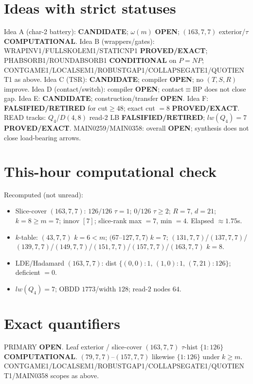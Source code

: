 \documentclass[11pt]{article}
\begin{document}
\section*{Ideas with strict statuses}
Idea A (char-2 battery): \textbf{CANDIDATE}; $\omega(m)$ \textbf{OPEN}; $(163,7,7)$ exterior/$\tau$ \textbf{COMPUTATIONAL}.
Idea B (wrappers/gates): WRAPINV1/FULLSKOLEM1/STATICNP1 \textbf{PROVED/EXACT};
PHABSORB1/ROUNDABSORB1 \textbf{CONDITIONAL} on $P=NP$;
CONTGAME1/LOCALSEM1/ROBUSTGAP1/COLLAPSEGATE1/QUOTIENT1 as above.
Idea C (TSR): \textbf{CANDIDATE}; compiler \textbf{OPEN}; no $(T,S,R)$ improve.
Idea D (contact/switch): compiler \textbf{OPEN}; contact$\equiv$BP does not close gap.
Idea E: \textbf{CANDIDATE}; construction/transfer \textbf{OPEN}.
Idea F: \textbf{FALSIFIED/RETIRED} for cut$\ge48$; exact cut $=8$ \textbf{PROVED/EXACT}.
READ tracks: $Q_4$/$D(4,8)$ read-$2$ LB \textbf{FALSIFIED/RETIRED}; $lw(Q_4)=7$ \textbf{PROVED/EXACT}.
MAIN0259/MAIN0358: overall \textbf{OPEN}; synthesis does not close load-bearing arrows.

\section*{This-hour computational check}
Recomputed (not unread):
\begin{itemize}
\item Slice-cover $(163,7,7)$: $126/126$ $\tau{=}1$; $0/126$ $\tau{\ge}2$; $R{=}7$, $d{=}21$;
  $k{=}8{\ge}m{=}7$; innov $[7]$; slice-rank max $=7$, min $=4$. Elapsed $\approx1.75$s.
\item $k$-table: $(43,7,7)$ $k{=}6{<}m$; $(67$--$127,7,7)$ $k{=}7$;
  $(131,7,7)$/$(137,7,7)$/$(139,7,7)$/$(149,7,7)$/$(151,7,7)$/$(157,7,7)$/$(163,7,7)$ $k{=}8$.
\item LDE/Hadamard $(163,7,7)$: dist $\{(0,0){:}1,\,(1,0){:}1,\,(7,21){:}126\}$; deficient $=0$.
\item $lw(Q_4)=7$; OBDD $1773$/width $128$; read-$2$ nodes $64$.
\end{itemize}

\section*{Exact quantifiers}
PRIMARY \textbf{OPEN}. Leaf exterior / slice-cover $(163,7,7)$ $\tau$-hist $\{1{:}126\}$ \textbf{COMPUTATIONAL}.
$(79,7,7)$--$(157,7,7)$ likewise $\{1{:}126\}$ under $k{\ge}m$. CONTGAME1/LOCALSEM1/ROBUSTGAP1/COLLAPSEGATE1/QUOTIENT1/MAIN0358 scopes as above.
\end{document}
